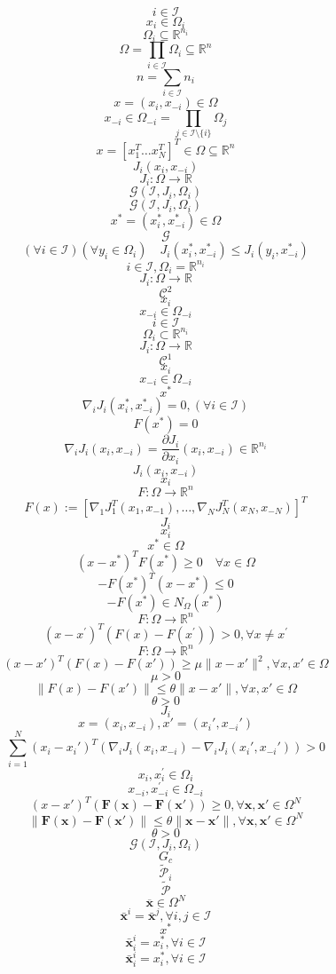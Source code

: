 \documentclass[11pt]{ctexart}
\begin{document}
$$i\in{\mathcal I}$$
$$x_{i}\in\Omega_{i}$$
$$\Omega_{i}\subseteq\mathbb{R}^{n_{i}}$$
$$\Omega=\prod_{i\in\mathcal{I}}\Omega_{i}\subseteq\mathbb{R}^{n}$$
$$n=\sum_{i\in\mathcal{I}}n_{i}$$
$$x=(x_{i},x_{-i})\in\Omega $$
$$x_{-i}\in\Omega_{-i}=\prod_{j\in\mathcal{I}\setminus\{i\}}\Omega_{j}$$
$$x=[x_{1}^{T}\ldots x_{N}^{T}]^{T}\in\Omega\subseteq\mathbb{R}^{n}$$
$$J_{i}(x_{i},x_{-i})$$
$$J_{i}:\Omega\rightarrow\mathbb{R}$$
$$\mathcal{G}(\mathcal{I},J_{i},\Omega_{i})$$
$$\mathcal{G}(\mathcal{I},J_{i},\Omega_{i})$$
$$x^{*}=(x_{i}^{*},x_{-i}^{*})\in\Omega $$
$$\mathcal{G}$$
$$(\forall i\in\mathcal{I})(\forall y_i\in\Omega_i)\quad J_i(x_i^*,x_{-i}^*)\leq J_i(y_i,x_{-i}^*)$$
$$i\in\mathcal{I},\Omega_{i}=\mathbb{R}^{n_{i}}$$
$$J_{i}:\Omega\rightarrow\mathbb{R}$$
$$\mathcal{C}^{2}$$
$$x_{i}$$
$$x_{-i}\in\Omega_{-i}$$
$$i\in{\mathcal I}$$
$$\Omega_{i}\subset\mathbb{R}^{n_{i}}$$
$$J_{i}:\Omega\rightarrow\mathbb{R}$$
$$\mathcal{C}^{1}$$
$$x_{i}$$
$$x_{-i}\in\Omega_{-i}$$
$$x^{*}$$
$$\nabla_iJ_i(x_i^*,x_{-i}^*)=0,(\forall i\in\mathcal{I})$$
$$F(x^{*})=0$$
$$\nabla_iJ_i(x_i,x_{-i})=\frac{\partial J_i}{\partial x_i}(x_i,x_{-i})\in\mathbb{R}^{n_i}$$
$$J_{i}(x_{i},x_{-i})$$
$$x_{i}$$
$$F:\Omega\rightarrow\mathbb{R}^{n}$$
$$F(x):=[\nabla_{1}J_{1}^{T}(x_{1},x_{-1}),\ldots,\nabla_{N}J_{N}^{T}(x_{N},x_{-N})]^{T}$$
$$J_{i}$$
$$x_{i}$$
$$x^{*}\in\Omega $$
$$(x-x^{*})^{T}F(x^{*})\geq0\quad\forall x\in\Omega $$
$$-F(x^{*})^{T}\left(x-x^{*}\right)\leq0$$
$$-F(x^{*})\in N_{\Omega}(x^{*})$$
$$F:\Omega\to\mathbb{R}^n$$
$$(x-x^{\prime})^{T}\left(F(x)-F(x^{\prime})\right)>0,\forall x\neq x^{\prime}$$
$$F:\Omega\to\mathbb{R}^n$$
$$(x-x')^{T}\left(F(x)-F(x')\right)\geq\mu\|x-x'\|^{2},\forall x,x'\in\Omega $$
$$\mu>0$$
$$\|F(x)-F(x')\|\leq\theta\|x-x'\|,\forall x,x'\in\Omega $$
$$\theta>0$$
$$J_{i}$$
$$x=(x_{i},x_{-i}),x'=(x_{i}',x_{-i}')$$
$$\displaystyle\sum_{i=1}^N(x_i-x_i')^T\left(\nabla_iJ_i(x_i,x_{-i})-\nabla_iJ_i(x_i',x_{-i}')\right)>0$$
$$x_{i},x_{i}^{\prime}\in\Omega_{i}$$
$$x_{-i},x_{-i}^{\prime}\in\Omega_{-i}$$
$$(x-x')^T\left(\mathbf{F}(\mathbf{x})-\mathbf{F}(\mathbf{x}')\right)\geq0,\forall\mathbf{x},\mathbf{x}'\in\Omega^N$$
$$\|\mathbf{F}(\mathbf{x})-\mathbf{F}(\mathbf{x}')\|\leq\theta\|\mathbf{x}-\mathbf{x}'\|,\forall\mathbf{x},\mathbf{x}'\in\Omega^N$$
$$\theta>0$$
$$\mathcal{G}(\mathcal{I},J_{i},\Omega_{i})$$
$$G_{c}$$
$$\tilde{\mathcal{P}}_{i}$$
$$\tilde{\mathcal{P}}$$
$$\mathbf{\overline{x}}\in\Omega^{N}$$
$$\bar{\mathbf{x}}^{i}=\bar{{\mathbf{x}}}^{j},\forall i,j\in\mathcal{I}$$
$$x^{*}$$
$$\bar{\mathbf{x}}_{i}^{i}=x_{i}^{*},\forall i\in\mathcal{I}$$
\[\bar{\mathbf{x}}_{i}^{i}=x_{i}^{*},\forall i\in\mathcal{I}\]
\end{document}
